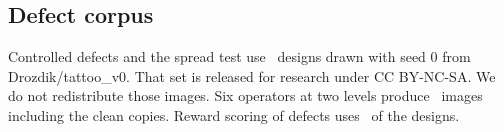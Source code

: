 \subsection{Defect corpus}
Controlled defects and the spread test use \nDegrDesigns\ designs drawn with seed 0 from Drozdik/tattoo\_v0.
That set is released for research under CC BY-NC-SA.
We do not redistribute those images.
Six operators at two levels produce \nDegrImgs\ images including the clean copies.
Reward scoring of defects uses \nDegrRewDesigns\ of the designs.


